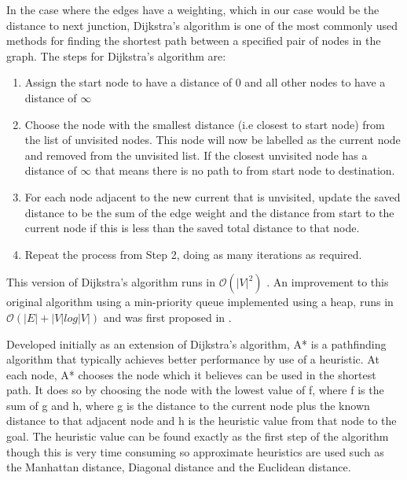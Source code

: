 In the case where the edges have a weighting, which in our case would be the 
distance to next junction, Dijkstra's algorithm is one 
of the most commonly used methods for finding the shortest path between a 
specified pair of nodes in the graph. The steps for Dijkstra's algorithm are:
\begin{enumerate}
\item Assign the start node to have a distance of 0 and all other nodes to 
have a distance of $\infty$
\item Choose the node with the smallest distance (i.e closest to start node) 
from the list of unvisited nodes. This node will now be labelled as the 
current node and removed from the unvisited list. If the closest unvisited 
node has a distance of $\infty$ that means there is no path to from start 
node to destination.
\item For each node adjacent to the new current that is unvisited, update 
the saved distance to be the sum of the edge weight and the distance from 
start to the current node if this is less than the saved total distance to 
that node. 
\item Repeat the process from Step 2, doing as many iterations as required.
\end{enumerate}
This version of Dijkstra's algorithm runs in $\mathcal{O}(|V|^{2})$ 
\cite{xu2007improved}. An improvement to this original algorithm using a 
min-priority queue implemented using a heap, runs in $\mathcal{O}
(|E| + |V|log |V|)$ and was first proposed in \cite{fredman1987fibonacci}. 

Developed initially as an extension of Dijkstra's algorithm, A* is a 
pathfinding algorithm that typically achieves better performance by 
use of a heuristic. At each node, A* chooses the node which it believes 
can be used in the shortest path. It does so by choosing the node with 
the lowest value of f, where f is the sum of g and h, where g is the 
distance to the current node plus the known distance to that adjacent 
node and h is the heuristic value from that node to the goal. The heuristic 
value can be found exactly as the first step of the algorithm though 
this is very time consuming so approximate heuristics are used such 
as the Manhattan distance, Diagonal distance and the Euclidean distance. 
